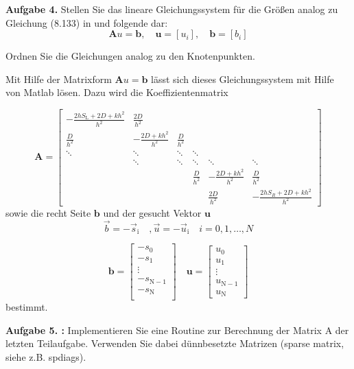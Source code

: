 \begin{mybox}
	\textbf{Aufgabe 4.} Stellen Sie das lineare Gleichungssystem für die Größen analog zu Gleichung (8.133) in \cite{Atkinson.2004} und folgende dar:
	\begin{equation}\label{eq:lgs}
		\mathbf{A} u = \mathbf{b},\quad \mathbf{u} = [u_i],\quad \mathbf{b} = [b_i]
	\end{equation}

	Ordnen Sie die Gleichungen analog zu den Knotenpunkten.
\end{mybox}




Mit Hilfe der Matrixform $\mathbf{A} u =\mathbf{ b} $ lässt sich dieses Gleichungssystem mit Hilfe von Matlab lösen. Dazu wird die Koeffizientenmatrix

\begin{equation}
\mathbf{A}=	\begin{bmatrix}
		-\frac{2hS_\mathrm{L}+2D+kh^2}{h^2} & \frac{2D}{h^2} & & &  &   \\
		\frac{D}{h^2} & - \frac{2D+kh^2}{h^2} & \frac{D}{h^2} &  &  & \\
	\ddots	&  \ddots &  \ddots &  \ddots &  &  \\
		& \ddots & \ddots & \ddots & \ddots  & \ddots \\
		&  &  & \frac{D}{h^2} & - \frac{2D+kh^2}{h^2} & \frac{D}{h^2} \\
		&  &  &  & \frac{2D}{h^2} & -\frac{2hS_R+2D+kh^2}{h^2}
	\end{bmatrix}
\end{equation}
sowie die recht Seite $\mathbf{b}$ und der gesucht Vektor $\mathbf{u}$
\begin{equation}
	\vec{b}=-\vec{s}_\mathrm{i}\quad,	\vec{u}=-\vec{u}_\mathrm{i} \quad i=0,1,\dots,N
\end{equation}

\begin{equation}
	\mathbf{b}=\begin{bmatrix}
	-	s_0 \\
	-	s_1 \\
		\vdots \\
	-	s_{\mathrm{N}-1} \\
	-	s_{\mathrm{N}} \\
	\end{bmatrix} \quad \mathbf{u}=\begin{bmatrix}
		u_0 \\
		u_1 \\
		\vdots \\
		u_{\mathrm{N}-1} \\
		u_\mathrm{N}
	\end{bmatrix}
\end{equation}
bestimmt.
\pagebreak
\begin{mybox}
	\textbf{Aufgabe 5. :} Implementieren Sie eine Routine zur Berechnung der Matrix A der letzten Teilaufgabe. Verwenden
	Sie dabei dünnbesetzte Matrizen (sparse matrix, siehe z.B. spdiags).
\end{mybox}

